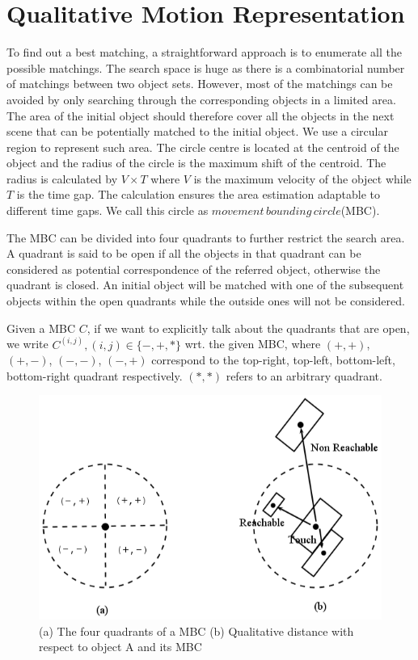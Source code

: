 \documentclass[letterpaper]{article}
\begin{document}
\section{Qualitative Motion Representation}

 To find out a best matching, a straightforward approach is to enumerate all the possible matchings. The search space is huge as there is a combinatorial number of matchings between two object sets. However, most of the matchings can be avoided by only searching through the corresponding objects in a limited area. The area of the initial object should therefore cover all the objects in the next scene that can be potentially matched to the initial object.  We use a circular region to represent such area. The circle centre is located at the centroid of the object and the radius of the circle is the maximum shift of the centroid. The radius is calculated by $V \times T$ where $V$ is the maximum velocity of the object while $T$ is the time gap. The calculation ensures the area estimation adaptable to different time gaps. We call this circle as $movement\,bounding\,circle$(MBC). 

The MBC can be divided into four quadrants to further restrict the search area. A quadrant is said to be open if all the objects in that quadrant can be considered as potential correspondence of the referred object, otherwise the quadrant is closed. An initial object will be matched with one of the subsequent objects within the open quadrants while the outside ones will not be considered. 

 Given a MBC $C$, if we want to explicitly talk about the quadrants that are open, we write $C^{(i,j)}, (i,j) \in \{-, +, *\}$ wrt. the given MBC, where $(+,+)$, $(+,-)$, $(-,-)$, $(-,+)$ correspond to the top-right, top-left, bottom-left, bottom-right quadrant respectively. $(*, *)$ refers to an arbitrary quadrant. 
\begin{figure}[h!]
\centering\includegraphics[scale=0.3]{quadrants.png}\caption{(a) The four quadrants of a MBC (b) Qualitative distance with respect to object A and its MBC}
\end{figure}
\end{document}
